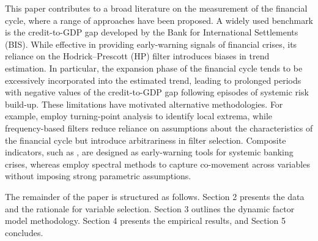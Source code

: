 This paper contributes to a broad literature on the measurement of the financial cycle, where a range of approaches have been proposed. A widely used benchmark is the credit-to-GDP gap developed by the Bank for International Settlements (BIS). While effective in providing early-warning signals of financial crises, its reliance on the Hodrick–Prescott (HP) filter introduces biases in trend estimation. In particular, the expansion phase of the financial cycle tends to be excessively incorporated into the estimated trend, leading to prolonged periods with negative values of the credit-to-GDP gap following episodes of systemic risk build-up. These limitations have motivated alternative methodologies. For example, \cite{drehmann2012characterising} employ turning-point analysis to identify local extrema, while frequency-based filters reduce reliance on assumptions about the characteristics of the financial cycle but introduce arbitrariness in filter selection. Composite indicators, such as \cite{lang2019anticipating}, are designed as early-warning tools for systemic banking crises, whereas \cite{schuler2020financial} employ spectral methods to capture co-movement across variables without imposing strong parametric assumptions.

The remainder of the paper is structured as follows. Section 2 presents the data and the rationale for variable selection. Section 3 outlines the dynamic factor model methodology. Section 4 presents the empirical results, and Section 5 concludes.